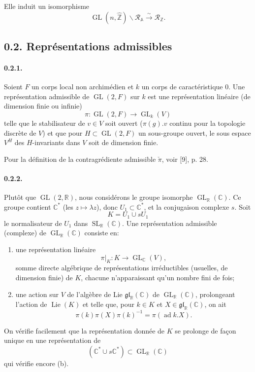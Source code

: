 \documentclass[10pt,a4paper]{article}
\providecommand{\GL}{\operatorname{GL}}
\providecommand{\SL}{\operatorname{SL}}
\providecommand{\Lie}{\operatorname{Lie}}
\providecommand{\R}{\mathbb R}
\providecommand{\Z}{\mathbb Z}
\providecommand{\C}{\mathbb C}
\providecommand{\A}{\mathbb A}
\providecommand{\calR}{\mathcal R}
\providecommand{\iso}{\xrightarrow{\sim}}
\begin{document}
\clearpage
{}
\hypertarget{authority-7}{}
Elle induit un isomorphisme
\[
\tag{0.1.4.2}
\GL(n,\widehat{\Z})\backslash\calR_{\A}\iso\calR_{\Z}.
\]

\subsection*{0.2. Représentations admissibles}

\paragraph{0.2.1.} Soient $F$ un corps local non archimédien et $k$ un corps de caractéristique $0$. Une représentation admissible de $\GL(2,F)$ sur $k$ est une représentation linéaire (de dimension finie ou infinie)
\[
\pi:\GL(2,F)\longrightarrow\GL_k(V)
\]
telle que le stabilisateur de $v\in V$ soit ouvert ($\pi(g).v$ continu pour la topologie discrète de $V$) et que pour $H\subset\GL(2,F)$ un sous-groupe ouvert, le sous espace $V^H$ des $H$-invariants dans $V$ soit de dimension finie.

Pour la définition de la contragrédiente admissible $\check\pi$, voir [9], p. 28.

\paragraph{0.2.2.} Plutôt que $\GL(2,\R)$, nous considérons le groupe isomorphe $\GL_{\R}(\C)$. Ce groupe contient $\C^*$ (les $z\mapsto\lambda z$), donc $U_1\subset\C^*$, et la conjugaison complexe $s$. Soit
\[
K=U_1\cup sU_1
\]
le normalisateur de $U_1$ dans $\SL_{\R}(\C)$. Une représentation admissible (complexe) de $\GL_{\R}(\C)$ consiste en:
\begin{enumerate}[label=(\alph*)]
\item une représentation linéaire
\[
\pi|_K:K\longrightarrow\GL_{\C}(V),
\]
somme directe algébrique de représentations irréductibles (usuelles, de dimension finie) de $K$, chacune n'apparaissant qu'un nombre fini de fois;
\item une action sur $V$ de l'algèbre de Lie $\mathfrak{gl}_{\R}(\C)$ de $\GL_{\R}(\C)$, prolongeant l'action de $\Lie(K)$ et telle que, pour $k\in K$ et $X\in\mathfrak{gl}_{\R}(\C)$, on ait
\[
\tag{0.2.2.1}
\pi(k)\pi(X)\pi(k)^{-1}=\pi(\operatorname{ad}k.X).
\]
\end{enumerate}
On vérifie facilement que la représentation donnée de $K$ se prolonge de façon unique en une représentation de
\[
(\C^*\cup s\C^*)\subset\GL_{\R}(\C)
\]
qui vérifie encore (b).
\end{document}
